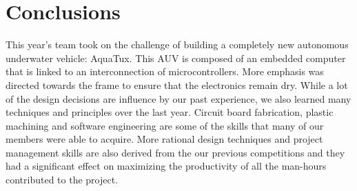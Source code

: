\section{Conclusions} 
\vspace{-.03in}

This year's team took on the challenge of building a completely new
autonomous underwater vehicle: AquaTux. This AUV is composed of an embedded
computer that is linked to an interconnection of microcontrollers. More emphasis was directed towards the frame to
ensure that the electronics remain dry. While a lot of the design
decisions are influence by our past experience, we also learned many
techniques and principles over the last year. Circuit board
fabrication, plastic machining and software engineering are some of
the skills that many of our members were able to acquire. More
rational design techniques and project management skills are also
derived from the our previous competitions and they had a significant
effect on maximizing the productivity of all the man-hours contributed
to the project.

